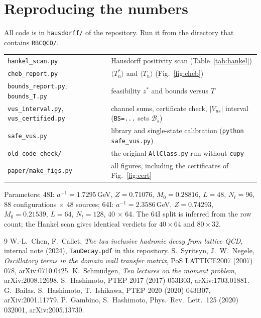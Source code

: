\documentclass[11pt]{article}
\newcommand{\Vus}{|V_{us}|}
\newcommand{\BR}{\mathcal{B}}
\theoremstyle{remark}
\begin{document}
\appendix
\section{Reproducing the numbers}
All code is in \texttt{hausdorff/} of the repository. Run it from the directory that contains \texttt{RBCQCD/}.
\begin{center}\small
\begin{tabular}{ll}
\toprule
\texttt{hankel\_scan.py} & Hausdorff positivity scan (Table~\ref{tab:hankel})\\
\texttt{cheb\_report.py} & $\langle T^*_n\rangle$ and $\langle T_n\rangle$ (Fig.~\ref{fig:cheb})\\
\texttt{bounds\_report.py}, \texttt{bounds\_T.py} & feasibility $z^*$ and bounds versus $T$\\
\texttt{vus\_interval.py}, \texttt{vus\_certified.py} & channel sums, certificate check, $\Vus$ interval (\texttt{BS=...} sets $\BR_s$)\\
\texttt{safe\_vus.py} & library and single-state calibration (\texttt{python safe\_vus.py})\\
\texttt{old\_code\_check/} & the original \texttt{AllClass.py} run without \texttt{cupy}\\
\texttt{paper/make\_figs.py} & all figures, including the certificates of Fig.~\ref{fig:cert}\\
\bottomrule
\end{tabular}
\end{center}
Parameters: 48I: $a^{-1}=1.7295$\,GeV, $Z=0.71076$, $M_0=0.28816$, $L=48$, $N_t=96$, 88 configurations $\times$ 48 sources;
64I: $a^{-1}=2.3586$\,GeV, $Z=0.74293$, $M_0=0.21539$, $L=64$, $N_t=128$, 40 $\times$ 64. The 64I split is inferred from the row count; the Hankel scan gives identical verdicts for $40\times64$ and $80\times32$.

\begin{thebibliography}{9}
 W.-L.~Chen, F.~Callet, \emph{The tau inclusive hadronic decay from lattice QCD}, internal note (2024), \texttt{TauDecay.pdf} in this repository.
 S.~Syritsyn, J.~W.~Negele, \emph{Oscillatory terms in the domain wall transfer matrix}, PoS LATTICE2007 (2007) 078, arXiv:0710.0425.
 K.~Schm\"udgen, \emph{Ten lectures on the moment problem}, arXiv:2008.12698.
 S.~Hashimoto, PTEP 2017 (2017) 053B03, arXiv:1703.01881.
 G.~Bailas, S.~Hashimoto, T.~Ishikawa, PTEP 2020 (2020) 043B07, arXiv:2001.11779.
 P.~Gambino, S.~Hashimoto, Phys.\ Rev.\ Lett.\ 125 (2020) 032001, arXiv:2005.13730.
\end{thebibliography}
\end{document}
